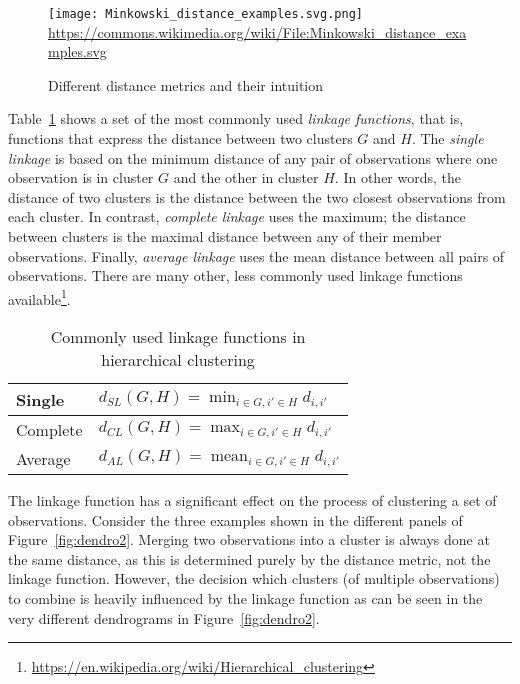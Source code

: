 \begin{figure}
\centering
\texttt{[image: Minkowski\_distance\_examples.svg.png]} \\

\scriptsize \url{https://commons.wikimedia.org/wiki/File:Minkowski_distance_examples.svg}
\caption{Different distance metrics and their intuition}
\label{fig:distance}
\end{figure}

Table~\ref{tab:linkages} shows a set of the most commonly used \emph{linkage functions}, that is, functions that express the distance between two clusters $G$ and $H$. The \emph{single linkage} is based on the minimum distance of any pair of observations where one observation is in cluster $G$ and the other in cluster $H$. In other words, the distance of two clusters is the distance between the two closest observations from each cluster. In contrast, \emph{complete linkage} uses the maximum; the distance between clusters is the maximal distance between any of their member observations. Finally, \emph{average linkage} uses the mean distance between all pairs of observations. There are many other, less commonly used linkage functions available\footnote{\url{https://en.wikipedia.org/wiki/Hierarchical_clustering}}.

\begin{table}
\renewcommand{\arraystretch}{1.5}
\centering

\begin{tabular}{l|l} \hline
Single & $\displaystyle d_{SL}(G,H) = \min_{i \in G, i' \in H} d_{i, i'}$  \\ \hline
Complete & $\displaystyle d_{CL}(G,H) = \max_{i \in G, i' \in H} d_{i, i'}$  \\ \hline
Average & $\displaystyle d_{AL}(G,H) = \operatorname*{mean}_{i \in G, i' \in H} d_{i, i'}$  \\ \hline
\end{tabular}
\caption{Commonly used linkage functions in hierarchical clustering}
\label{tab:linkages}
\end{table}

The linkage function has a significant effect on the process of clustering a set of observations. Consider the three examples shown in the different panels of Figure~\ref{fig:dendro2}. Merging two observations into a cluster is always done at the same distance, as this is determined purely by the distance metric, not the linkage function. However, the decision which clusters (of multiple observations) to combine is heavily influenced by the linkage function as can be seen in the very different dendrograms in Figure~\ref{fig:dendro2}. 

